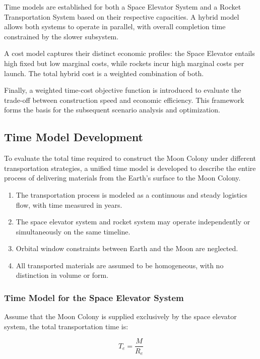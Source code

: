 \documentclass{mcmthesis}
\begin{document}
Time models are established for both a Space Elevator System and a Rocket Transportation System based on their respective capacities. A hybrid model allows both systems to operate in parallel, with overall completion time constrained by the slower subsystem.

A cost model captures their distinct economic profiles: the Space Elevator entails high fixed but low marginal costs, while rockets incur high marginal costs per launch. The total hybrid cost is a weighted combination of both.

Finally, a weighted time-cost objective function is introduced to evaluate the trade-off between construction speed and economic efficiency. This framework forms the basis for the subsequent scenario analysis and optimization.


\subsection{Time Model Development}

To evaluate the total time required to construct the Moon Colony under different transportation strategies, a unified time model is developed to describe the entire process of delivering materials from the Earth's surface to the Moon Colony.
\begin{enumerate}
    \item The transportation process is modeled as a continuous and steady logistics flow, with time measured in years.

    \item The space elevator system and rocket system may operate independently or simultaneously on the same timeline.

    \item Orbital window constraints between Earth and the Moon are neglected.

    \item All transported materials are assumed to be homogeneous, with no distinction in volume or form.
\end{enumerate}

\subsubsection{Time Model for the Space Elevator System}

Assume that the Moon Colony is supplied exclusively by the space elevator system, the total transportation time is:

\[T_e=\frac{M}{R_e}\]
\end{document}
